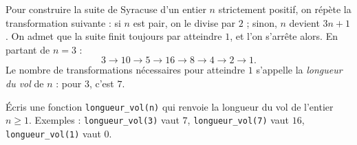 Pour construire la suite de Syracuse d'un entier $n$ strictement positif, on répète la transformation suivante : si $n$ est pair, on le divise par $2$ ; sinon, $n$ devient $3n + 1$. On admet que la suite finit toujours par atteindre $1$, et l'on s'arrête alors. En partant de $n = 3$ :
\[3 \to 10 \to 5 \to 16 \to 8 \to 4 \to 2 \to 1.\]
Le nombre de transformations nécessaires pour atteindre $1$ s'appelle la \emph{longueur du vol} de $n$ : pour $3$, c'est $7$.

Écris une fonction \texttt{longueur\_vol(n)} qui renvoie la longueur du vol de l'entier $n \ge 1$. Exemples : \texttt{longueur\_vol(3)} vaut $7$, \texttt{longueur\_vol(7)} vaut $16$, \texttt{longueur\_vol(1)} vaut $0$.

